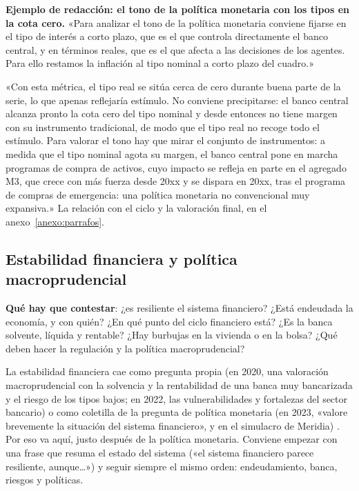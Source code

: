 \documentclass[11pt]{article}
\begin{document}
\begin{anotaciones}
\textbf{Ejemplo de redacción: el tono de la política monetaria con los tipos en la cota cero.}
«Para analizar el tono de la política monetaria conviene fijarse en el tipo de interés a corto plazo, que es el que controla directamente el banco central, y en términos reales, que es el que afecta a las decisiones de los agentes. Para ello restamos la inflación al tipo nominal a corto plazo del cuadro.»

«Con esta métrica, el tipo real se sitúa cerca de cero durante buena parte de la serie, lo que apenas reflejaría estímulo. No conviene precipitarse: el banco central alcanza pronto la cota cero del tipo nominal y desde entonces no tiene margen con su instrumento tradicional, de modo que el tipo real no recoge todo el estímulo. Para valorar el tono hay que mirar el conjunto de instrumentos: a medida que el tipo nominal agota su margen, el banco central pone en marcha programas de compra de activos, cuyo impacto se refleja en parte en el agregado M3, que crece con más fuerza desde 20xx y se dispara en 20xx, tras el programa de compras de emergencia: una política monetaria no convencional muy expansiva.» La relación con el ciclo y la valoración final, en el anexo~\ref{anexo:parrafos}.
\end{anotaciones}

\subsection{Estabilidad financiera y política macroprudencial}\label{sec:estabilidad}

\begin{ideaclave}
\textbf{Qué hay que contestar}: ¿es resiliente el sistema financiero? ¿Está endeudada la economía, y con quién? ¿En qué punto del ciclo financiero está? ¿Es la banca solvente, líquida y rentable? ¿Hay burbujas en la vivienda o en la bolsa? ¿Qué deben hacer la regulación y la política macroprudencial?
\end{ideaclave}

\begin{notaopositor}
La estabilidad financiera cae como pregunta propia (en 2020, una valoración macroprudencial con la solvencia y la rentabilidad de una banca muy bancarizada y el riesgo de los tipos bajos; en 2022, las vulnerabilidades y fortalezas del sector bancario) o como coletilla de la pregunta de política monetaria (en 2023, «valore brevemente la situación del sistema financiero», y en el simulacro de Meridia) \parencite{ATCEE2026Examenes}. Por eso va aquí, justo después de la política monetaria. Conviene empezar con una frase que resuma el estado del sistema («el sistema financiero parece resiliente, aunque…») y seguir siempre el mismo orden: endeudamiento, banca, riesgos y políticas.
\end{notaopositor}
\end{document}
